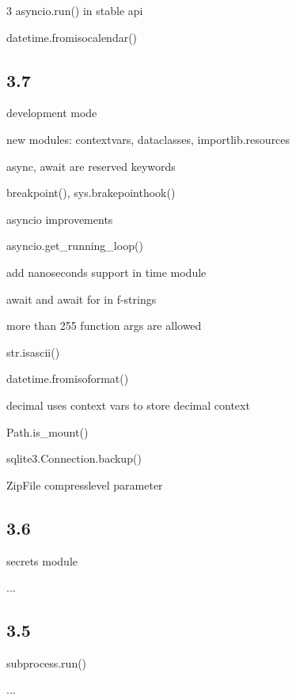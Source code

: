 \documentclass [8pt] {extarticle}
\begin{document}
\begin {multicols} {3}
    asyncio.run() in stable api

    datetime.fromisocalendar()

    \subsection {3.7}

    development mode

    new modules: contextvars, dataclasses, importlib.resources

    async, await are reserved keywords

    breakpoint(), sys.brakepointhook()

    asyncio improvements

    asyncio.get\_running\_loop()

    add nanoseconds support in time module

    await and await for in f-strings

    more than 255 function args are allowed

    str.isascii()

    datetime.fromisoformat()

    decimal uses context vars to store decimal context

    Path.is\_mount()

    sqlite3.Connection.backup()

    ZipFile compresslevel parameter

    \subsection {3.6}

    secrets module

    ...

    \subsection {3.5}

    subprocess.run()

    ...

    \end {multicols}
\end{document}
